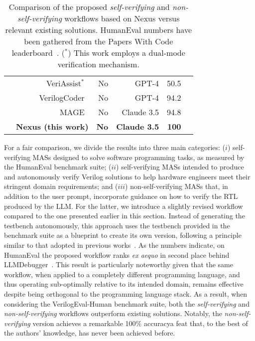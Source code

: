 \begin{table}[!h]
{\begin{tabular}{lrrrrr}
            &VeriAssist$^{*}$~\cite{huang2024towards} &No &GPT-4 &50.5 \\
            &VerilogCoder~\cite{ho2024verilogcoder} &No &GPT-4 &94.2 \\
            &MAGE~\cite{zhao2024mage} &No &Claude 3.5 &94.8 \\
            &\cellcolor{blue!25}\textbf{Nexus (this work)} &\cellcolor{blue!25}\textbf{No} &\cellcolor{blue!25}\textbf{Claude 3.5} &\cellcolor{blue!25}\textbf{100} \\
            \bottomrule
            \end{tabular}
    }
    \vspace{8pt}
    \caption{Comparison of the proposed {\em self-verifying} and {\em non-self-verifying} workflows based on Nexus versus relevant existing solutions. HumanEval numbers have been gathered from the Papers With Code leaderboard~\cite{humaneval_leaderboard}. ($^{*}$) This work employs a dual-mode verification mechanism.}
    \label{tab:coding_comp}
\end{table}

For a fair comparison, we divide the results into three main categories: ($i$) self-verifying MASs designed to solve software programming tasks, as measured by the HumanEval benchmark suite; ($ii$) self-verifying MASs intended to produce and autonomously verify Verilog solutions to help hardware engineers meet their stringent domain requirements; and ($iii$) non-self-verifying MASs that, in addition to the user prompt, incorporate guidance on how to verify the RTL produced by the LLM. For the latter, we introduce a slightly revised workflow compared to the one presented earlier in this section. Instead of generating the testbench autonomously, this approach uses the testbench provided in the benchmark suite as a blueprint to create its own version, following a principle similar to that adopted in previous works~\cite{huang2024towards,ho2024verilogcoder,zhao2024mage}. As the numbers indicate, on HumanEval the proposed workflow ranks {\em ex aequo} in second place behind LLMDebugger~\cite{zhong2024ldb}. This result is particularly noteworthy given that the same workflow, when applied to a completely different programming language, and thus operating sub-optimally relative to its intended domain, remains effective despite being orthogonal to the programming language stack. As a result, when considering the VerilogEval-Human benchmark suite, both the {\em self-verifying} and {\em non-self-verifying} workflows outperform existing solutions. Notably, the {\em non-self-verifying} version achieves a remarkable 100\% accuracy\textemdash a feat that, to the best of the authors' knowledge, has never been achieved before.


